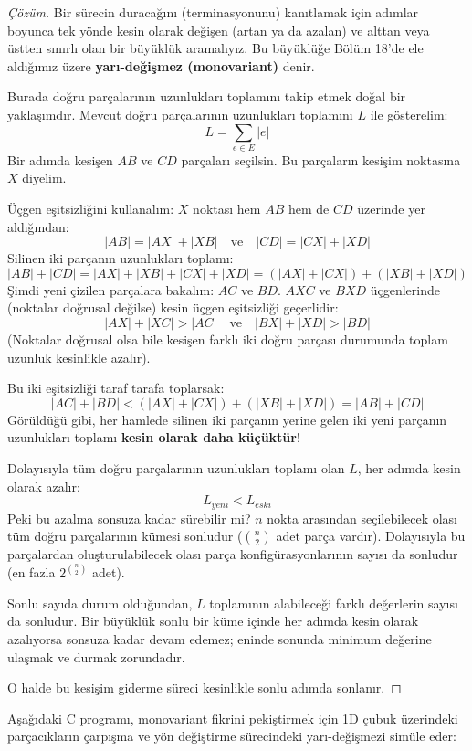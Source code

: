 \begin{proof}[Çözüm]
Bir sürecin duracağını (terminasyonunu) kanıtlamak için adımlar boyunca tek yönde kesin olarak değişen (artan ya da azalan) ve alttan veya üstten sınırlı olan bir büyüklük aramalıyız. Bu büyüklüğe Bölüm 18'de ele aldığımız üzere \textbf{yarı-değişmez (monovariant)} denir.

Burada doğru parçalarının uzunlukları toplamını takip etmek doğal bir yaklaşımdır.
Mevcut doğru parçalarının uzunlukları toplamını $L$ ile gösterelim:
\[
L = \sum_{e \in E} |e|
\]
Bir adımda kesişen $AB$ ve $CD$ parçaları seçilsin. Bu parçaların kesişim noktasına $X$ diyelim.

Üçgen eşitsizliğini kullanalım:
$X$ noktası hem $AB$ hem de $CD$ üzerinde yer aldığından:
\[
|AB| = |AX| + |XB| \quad \text{ve} \quad |CD| = |CX| + |XD|
\]
Silinen iki parçanın uzunlukları toplamı:
\[
|AB| + |CD| = |AX| + |XB| + |CX| + |XD| = (|AX| + |CX|) + (|XB| + |XD|)
\]
Şimdi yeni çizilen parçalara bakalım: $AC$ ve $BD$.
$AXC$ ve $BXD$ üçgenlerinde (noktalar doğrusal değilse) kesin üçgen eşitsizliği geçerlidir:
\[
|AX| + |XC| > |AC| \quad \text{ve} \quad |BX| + |XD| > |BD|
\]
(Noktalar doğrusal olsa bile kesişen farklı iki doğru parçası durumunda toplam uzunluk kesinlikle azalır).

Bu iki eşitsizliği taraf tarafa toplarsak:
\[
|AC| + |BD| < (|AX| + |CX|) + (|XB| + |XD|) = |AB| + |CD|
\]
Görüldüğü gibi, her hamlede silinen iki parçanın yerine gelen iki yeni parçanın uzunlukları toplamı \textbf{kesin olarak daha küçüktür}!

Dolayısıyla tüm doğru parçalarının uzunlukları toplamı olan $L$, her adımda kesin olarak azalır:
\[
L_{yeni} < L_{eski}
\]
Peki bu azalma sonsuza kadar sürebilir mi?
$n$ nokta arasından seçilebilecek olası tüm doğru parçalarının kümesi sonludur ($\binom{n}{2}$ adet parça vardır). Dolayısıyla bu parçalardan oluşturulabilecek olası parça konfigürasyonlarının sayısı da sonludur (en fazla $2^{\binom{n}{2}}$ adet).

Sonlu sayıda durum olduğundan, $L$ toplamının alabileceği farklı değerlerin sayısı da sonludur. Bir büyüklük sonlu bir küme içinde her adımda kesin olarak azalıyorsa sonsuza kadar devam edemez; eninde sonunda minimum değerine ulaşmak ve durmak zorundadır.

O halde bu kesişim giderme süreci kesinlikle sonlu adımda sonlanır.
\end{proof}

Aşağıdaki C programı, monovariant fikrini pekiştirmek için 1D çubuk üzerindeki parçacıkların çarpışma ve yön değiştirme sürecindeki yarı-değişmezi simüle eder:

